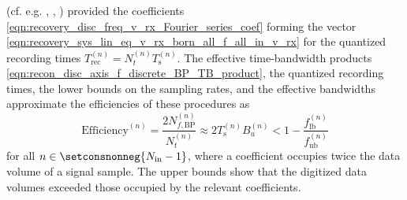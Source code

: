 (cf. e.g.
\cite[Sect. 3.3.2]{book:Mallat2009},
\cite[Sect. 2.2.3]{book:Manolakis2005},
\cite[Sect. 6.2]{book:Briggs1995}%
) provided
the  coefficients
\eqref{eqn:recovery_disc_freq_v_rx_Fourier_series_coef} forming
the vector
\eqref{eqn:recovery_sys_lin_eq_v_rx_born_all_f_all_in_v_rx} for
the quantized recording times
$T_{ \text{rec} }^{(n)} = N_{t}^{(n)} T_{\text{s}}^{(n)}$.
The effective time-bandwidth products
\eqref{eqn:recon_disc_axis_f_discrete_BP_TB_product},
the quantized recording times,
the lower bounds on
the sampling rates, and
the effective bandwidths approximate
the efficiencies of
these procedures as
\begin{equation}
  \text{Efficiency}^{(n)}
  =
  \frac{
    2 N_{f, \text{BP}}^{(n)}
  }{
    N_{t}^{(n)}
  }
  \approx
  2 T_{\text{s}}^{(n)} B_{ u }^{(n)}
  <
  1 - \frac{ f_{\text{lb}}^{(n)} }{ f_{\text{ub}}^{(n)} }
 \label{eqn:imp_fourier_coef_efficiency}
\end{equation}
for
all $n \in \setconsnonneg{ N_{\text{in}} - 1 }$, where
a  coefficient occupies
twice the data volume of
a signal sample.
The upper bounds show that
the digitized data volumes exceeded
those occupied by
the relevant  coefficients.
